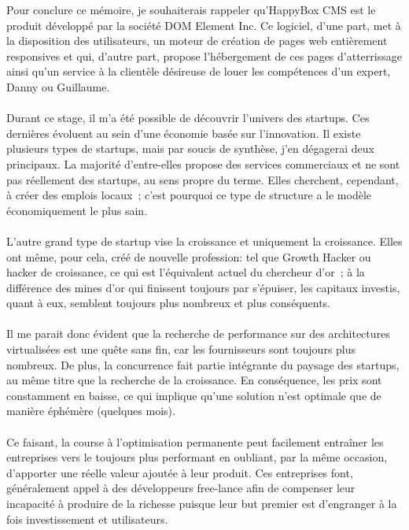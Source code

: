 \documentclass[11pt, a4paper ]{article}
\begin{document}
\begin{spacing}{1.5}



Pour conclure ce mémoire, je souhaiterais rappeler qu'HappyBox CMS est le produit développé par la société DOM Element Inc. Ce logiciel, d'une part, met à la disposition des utilisateurs, un moteur de création de pages web entièrement responsives et qui, d'autre part, propose l'hébergement de ces pages d’atterrissage ainsi qu'un service à la clientèle désireuse de louer les compétences d'un expert, Danny ou Guillaume.
\paragraph{}
Durant ce stage, il m'a été possible de découvrir l'univers des startups. Ces dernières évoluent au sein d'une économie basée sur l'innovation. Il existe plusieurs types de startups, mais par soucis de synthèse, j'en dégagerai deux principaux.
La majorité d'entre-elles propose des services commerciaux et ne sont pas réellement des startups, au sens propre du terme. Elles cherchent, cependant, à créer des emplois locaux ; c'est pourquoi ce type de structure a le modèle économiquement le plus sain.
\paragraph{}
L'autre grand type de startup vise la croissance et uniquement la croissance. Elles ont même, pour cela, créé de nouvelle profession: tel que Growth Hacker ou hacker de croissance, ce qui est l'équivalent actuel du chercheur d'or ; à la différence des mines d'or qui finissent toujours par s'épuiser, les capitaux investis, quant à eux, semblent toujours plus nombreux et plus conséquents.

\paragraph{}
Il me parait donc évident que la recherche de performance sur des architectures virtualisées est une quête sans fin, car les fournisseurs sont toujours plus nombreux. De plus, la concurrence fait partie intégrante du paysage des startups, au même titre que la recherche de la croissance. En conséquence, les prix sont constamment en baisse, ce qui implique qu'une solution n'est optimale que de manière éphémère (quelques mois).

\paragraph{}
Ce faisant, la course à l'optimisation permanente peut facilement entraîner les entreprises vers le toujours plus performant en oubliant, par la même occasion, d'apporter une réelle valeur ajoutée à leur produit. Ces entreprises font, généralement appel à des développeurs free-lance afin de compenser leur incapacité à produire de la richesse puisque leur but premier est d'engranger à la fois investissement et utilisateurs.


\end{spacing}
\end{document}
